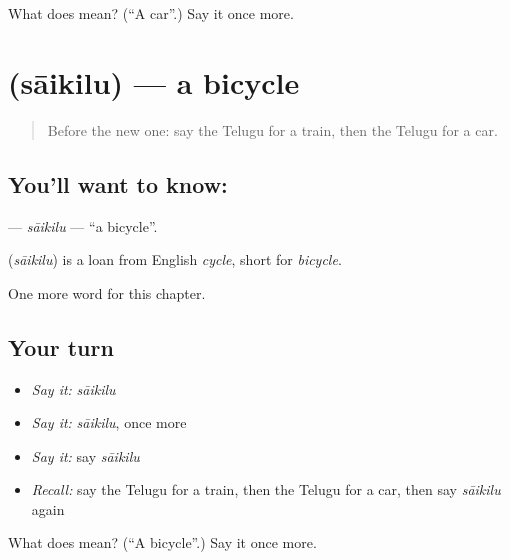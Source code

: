 \begin{tcolorbox}[breakable,colback=teal!4,colframe=teal!35!black,title={Before you move on}]
What does  mean? (\textquotedblleft{}A car\textquotedblright{}.) Say it once more.
\end{tcolorbox}
\section[\texorpdfstring{\te{సైకిలు} (sāikilu)}{సైకిలు (sāikilu)}]{ (sāikilu) — a bicycle}

\label{lesson:TE-C134-saikilu}



\begin{quote}
Before the new one: say the Telugu for a train, then the Telugu for a car.
\end{quote}

\subsection*{You'll want to know: }
\textbf{} — \emph{sāikilu} — \textquotedblleft{}a bicycle\textquotedblright{}.

\begin{cousinweb}
\textbf{} (\emph{sāikilu}) is a loan from English \emph{cycle}, short for \emph{bicycle}.
\end{cousinweb}

\begin{grammarlens}[title={What you've built}]
One more word for this chapter.
\end{grammarlens}

\subsection*{Your turn}
\begin{itemize}
\raggedright
  \item \emph{Say it:} \emph{sāikilu}
  \item \emph{Say it:} \emph{sāikilu}, once more
  \item \emph{Say it:} say \emph{sāikilu}
  \item \emph{Recall:} say the Telugu for a train, then the Telugu for a car, then say \emph{sāikilu} again
\end{itemize}

\begin{tcolorbox}[breakable,colback=teal!4,colframe=teal!35!black,title={Before you move on}]
What does  mean? (\textquotedblleft{}A bicycle\textquotedblright{}.) Say it once more.
\end{tcolorbox}
